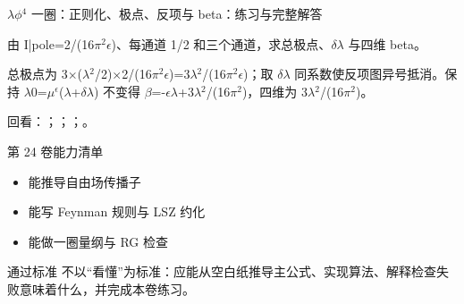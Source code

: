 \begin{frame}[t]{\ensuremath{\lambda}\ensuremath{\phi}\ensuremath{^{4}} 一圈：正则化、极点、反项与 beta：练习与完整解答}
\footnotesize
\begin{block}{}由 I|pole=2/\allowbreak{}(16\ensuremath{\pi}\ensuremath{^{2}}\ensuremath{\epsilon})、每通道 1/\allowbreak{}2 和三个通道，求总极点、\ensuremath{\delta}\ensuremath{\lambda} 与四维 beta。\end{block}
\begin{exampleblock}{}总极点为 3\ensuremath{\times}(\ensuremath{\lambda}\ensuremath{^{2}}/\allowbreak{}2)\ensuremath{\times}2/\allowbreak{}(16\ensuremath{\pi}\ensuremath{^{2}}\ensuremath{\epsilon})=3\ensuremath{\lambda}\ensuremath{^{2}}/\allowbreak{}(16\ensuremath{\pi}\ensuremath{^{2}}\ensuremath{\epsilon})；取 \ensuremath{\delta}\ensuremath{\lambda} 同系数使反项图异号抵消。保持 \ensuremath{\lambda}0=\ensuremath{\mu}\ensuremath{^{\epsilon}}(\ensuremath{\lambda}+\ensuremath{\delta}\ensuremath{\lambda}) 不变得 \ensuremath{\beta}=-\ensuremath{\epsilon}\ensuremath{\lambda}+3\ensuremath{\lambda}\ensuremath{^{2}}/\allowbreak{}(16\ensuremath{\pi}\ensuremath{^{2}})，四维为 3\ensuremath{\lambda}\ensuremath{^{2}}/\allowbreak{}(16\ensuremath{\pi}\ensuremath{^{2}})。\end{exampleblock}
\vfill
\scriptsize 回看：；；；。
\end{frame}

\begin{frame}[t]{第 24 卷能力清单}
\small\begin{itemize}
\item[\CheckMark] 能推导自由场传播子
\item[\CheckMark] 能写 Feynman 规则与 LSZ 约化
\item[\CheckMark] 能做一圈量纲与 RG 检查
\end{itemize}\vfill\begin{block}{通过标准}
不以“看懂”为标准：应能从空白纸推导主公式、实现算法、解释检查失败意味着什么，并完成本卷练习。
\end{block}\end{frame}

